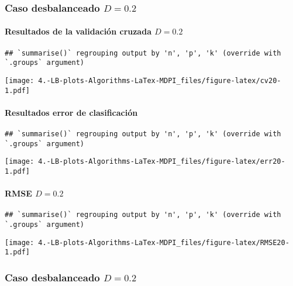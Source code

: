 \documentclass[
]{article}
\begin{document}
\hypertarget{caso-desbalanceado-d0.2}{%
\subsubsection{\texorpdfstring{Caso desbalanceado
\(D=0.2\)}{Caso desbalanceado D=0.2}}\label{caso-desbalanceado-d0.2}}

\hypertarget{resultados-de-la-validaciuxf3n-cruzada-d0.2}{%
\paragraph{\texorpdfstring{Resultados de la validación cruzada
\(D=0.2\)}{Resultados de la validación cruzada D=0.2}}\label{resultados-de-la-validaciuxf3n-cruzada-d0.2}}

\begin{verbatim}
## `summarise()` regrouping output by 'n', 'p', 'k' (override with `.groups` argument)
\end{verbatim}

\texttt{[image: 4.-LB-plots-Algorithms-LaTex-MDPI\_files/figure-latex/cv20-1.pdf]}

\hypertarget{resultados-error-de-clasificaciuxf3n-2}{%
\paragraph{Resultados error de
clasificación}\label{resultados-error-de-clasificaciuxf3n-2}}

\begin{verbatim}
## `summarise()` regrouping output by 'n', 'p', 'k' (override with `.groups` argument)
\end{verbatim}

\texttt{[image: 4.-LB-plots-Algorithms-LaTex-MDPI\_files/figure-latex/err20-1.pdf]}

\hypertarget{rmse-d0.2}{%
\paragraph{\texorpdfstring{RMSE
\(D=0.2\)}{RMSE D=0.2}}\label{rmse-d0.2}}

\begin{verbatim}
## `summarise()` regrouping output by 'n', 'p', 'k' (override with `.groups` argument)
\end{verbatim}

\texttt{[image: 4.-LB-plots-Algorithms-LaTex-MDPI\_files/figure-latex/RMSE20-1.pdf]}

\hypertarget{caso-desbalanceado-d0.2-1}{%
\subsubsection{\texorpdfstring{Caso desbalanceado
\(D=0.2\)}{Caso desbalanceado D=0.2}}\label{caso-desbalanceado-d0.2-1}}
\end{document}
